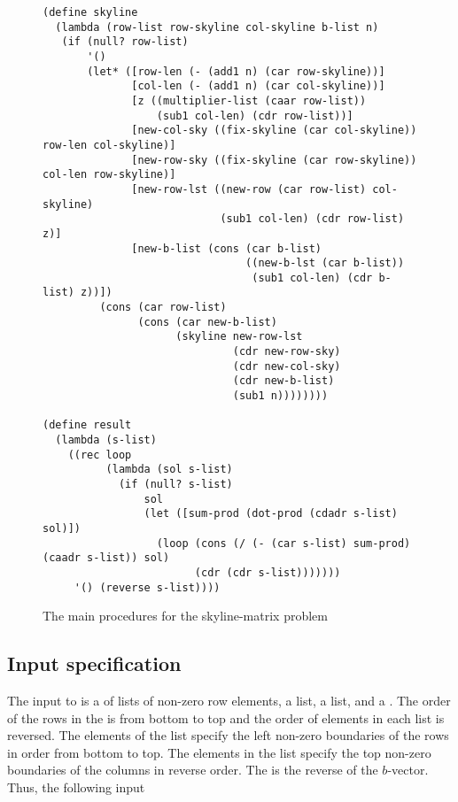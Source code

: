 \begin{figure}
\begin{frameit}
\begin{verbatim}
(define skyline
  (lambda (row-list row-skyline col-skyline b-list n)
   (if (null? row-list)
       '()
       (let* ([row-len (- (add1 n) (car row-skyline))]
              [col-len (- (add1 n) (car col-skyline))]
              [z ((multiplier-list (caar row-list))
                  (sub1 col-len) (cdr row-list))]
              [new-col-sky ((fix-skyline (car col-skyline)) row-len col-skyline)]
              [new-row-sky ((fix-skyline (car row-skyline)) col-len row-skyline)]
              [new-row-lst ((new-row (car row-list) col-skyline)
                            (sub1 col-len) (cdr row-list) z)]
              [new-b-list (cons (car b-list)
                                ((new-b-lst (car b-list))
                                 (sub1 col-len) (cdr b-list) z))])
         (cons (car row-list)
               (cons (car new-b-list)
                     (skyline new-row-lst
                              (cdr new-row-sky)
                              (cdr new-col-sky)
                              (cdr new-b-list)
                              (sub1 n))))))))

(define result
  (lambda (s-list)
    ((rec loop
          (lambda (sol s-list)
            (if (null? s-list)
                sol
                (let ([sum-prod (dot-prod (cdadr s-list) sol)])
                  (loop (cons (/ (- (car s-list) sum-prod) (caadr s-list)) sol)
                        (cdr (cdr s-list)))))))
     '() (reverse s-list))))
\end{verbatim}
\caption{The main procedures for the skyline-matrix problem}
\label{fig:skyline}
\end{frameit}
\end{figure}

\subsection{Input specification}

The input to  is a  of lists of non-zero row
elements, a  list, a  list, and a
.  The order of the rows in the  is from bottom to
top and the order of elements in each list is reversed.  The elements of the
 list specify the left non-zero boundaries of the rows in
order from bottom to top.  The elements in the  list
specify the top non-zero boundaries of the columns in reverse order.  The
 is the reverse of the $b$-vector.  Thus, the following input

